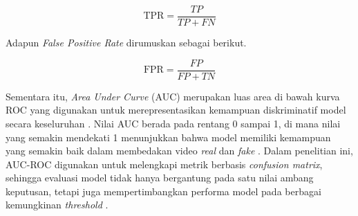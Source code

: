 \vspace{0.5\baselineskip}
\begin{equation}
\mathrm{\text{TPR}} = \frac{TP}{TP + FN}
\label{eq:tpr}
\end{equation}
\vspace{0.5\baselineskip}

Adapun \textit{False Positive Rate} dirumuskan sebagai berikut.

\vspace{0.5\baselineskip}
\begin{equation}
\mathrm{\text{FPR}} = \frac{FP}{FP + TN}
\label{eq:fpr}
\end{equation}
\vspace{0.5\baselineskip}

Sementara itu, \textit{Area Under Curve} (AUC) merupakan luas area di bawah kurva ROC yang digunakan untuk merepresentasikan kemampuan diskriminatif model secara keseluruhan \cite{FAWCETT2006861}. Nilai AUC berada pada rentang 0 sampai 1, di mana nilai yang semakin mendekati 1 menunjukkan bahwa model memiliki kemampuan yang semakin baik dalam membedakan video \textit{real} dan \textit{fake} \cite{FAWCETT2006861}. Dalam penelitian ini, AUC-ROC digunakan untuk melengkapi metrik berbasis \textit{confusion matrix}, sehingga evaluasi model tidak hanya bergantung pada satu nilai ambang keputusan, tetapi juga mempertimbangkan performa model pada berbagai kemungkinan \textit{threshold} \cite{FAWCETT2006861}\cite{powers2020evaluationprecisionrecallfmeasure}. \par

